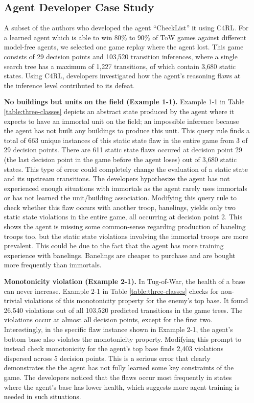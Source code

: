 \documentclass[letterpaper]{article} %
\begin{document}
\subsection{Agent Developer Case Study}

A subset of the authors who developed the agent ``CheckList'' it using C4RL.
For a learned agent which is able to win 80\% to 90\% of ToW games against different model-free agents, we selected one game replay where the agent lost.
This game consists of 29 decision points and 103,520 transition inferences, where a single search tree has a maximum of 1,227 transitions, of which contain 3,680 static states.
Using C4RL, developers investigated how the agent's reasoning flaws at the inference level contributed to its defeat.

\textbf{No buildings but units on the field (Example 1-1).}
Example 1-1 in Table \ref{table:three-classes} depicts an abstract state produced by the agent where it expects to have an immortal unit on the field; an impossible inference because the agent has not built any buildings to produce this unit.
This query rule finds a total of 663 unique instances of this static state flaw in the entire game from 3 of 29 decision points.
There are 611 static state flaws occured at decision point 29 (the last decision point in the game before the agent loses) out of 3,680 static states. 
This type of error could completely change the evaluation of a static state and its upstream transitions. 
The developers hypothesize the agent has not experienced enough situations with immortals as the agent rarely uses immortals or 
has not learned the unit/building association.
Modifying this query rule to check whether this flaw occurs with another troop, banelings,
yields only two static state violations in the entire game, all occurring at decision point 2.
This shows the agent is missing some common-sense regarding production of baneling troops too, but the static state violations involving the immortal troops are more prevalent.
This could be due to the fact that the agent has more training experience with banelings. Banelings are cheaper to purchase and are bought more frequently than immortals.

\textbf{Monotonicity violation (Example 2-1).}
\label{sec:caseStudy2-1}
In Tug-of-War, the health of a base can never increase. Example 2-1 in Table \ref{table:three-classes} checks for non-trivial violations of this monotonicity property 
for the enemy's top base. It found 26,540 violations out of all 103,520 predicted transitions in the game trees. The violations occur at almost all decision points, except for the first two. 
Interestingly, in the specific flaw instance shown in Example 2-1, the agent's bottom base also violates the monotonicity property. 
Modifying this prompt to instead check monotonicity for the agent's top base finds 2,403 violations dispersed across 5 decision points.   
This is a serious error that clearly demonstrates the the agent has not fully learned some key constraints of the game. 
The developers noticed that the flaws occur most frequently in states where the agent's base has lower health, which suggests more agent training is needed in such situations.
\end{document}
